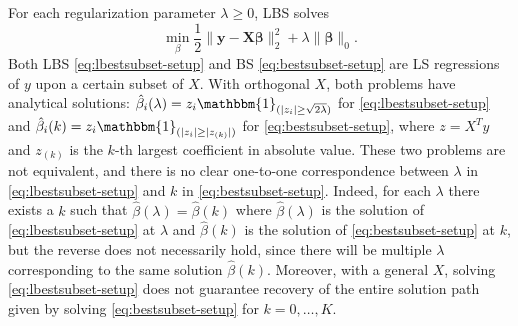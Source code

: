 For each regularization parameter $\lambda \ge 0$, LBS solves
\begin{equation}
	\min_\beta \frac{1}{2} \lVert \mathbf{y}-\mathbf{X\beta}\rVert_2^2 + \lambda\lVert \mathbf{\beta} \rVert_0.
\label{eq:lbestsubset-setup}
\end{equation} 
Both LBS \eqref{eq:lbestsubset-setup} and BS \eqref{eq:bestsubset-setup} are LS regressions of $y$ upon a certain subset of $X$. With orthogonal $X$, both problems have analytical solutions: $\hat{\beta}_i(\lambda)=z_i \mathbbm{1}_{(|z_{i}| \ge \sqrt{2\lambda})}$ for \eqref{eq:lbestsubset-setup} and $\hat{\beta}_i(k)=z_i \mathbbm{1}_{(|z_{i}| \ge |z_{(k)}|)}$ for \eqref{eq:bestsubset-setup}, where $z=X^T y$ and $z_{(k)}$ is the $k$-th largest coefficient in absolute value. These two problems are not equivalent, and there is no clear one-to-one correspondence between $\lambda$ in \eqref{eq:lbestsubset-setup} and $k$ in \eqref{eq:bestsubset-setup}. Indeed, for each $\lambda$ there exists a $k$ such that $\hat{\beta}(\lambda) = \hat{\beta}(k)$ where $\hat{\beta}(\lambda)$ is the solution of \eqref{eq:lbestsubset-setup} at $\lambda$ and $\hat{\beta}(k)$ is the solution of \eqref{eq:bestsubset-setup} at $k$, but the reverse does not necessarily hold, since there will be multiple $\lambda$ corresponding to the same solution $\hat{\beta}(k)$. Moreover, with a general $X$, solving \eqref{eq:lbestsubset-setup} does not guarantee recovery of the entire solution path given by solving \eqref{eq:bestsubset-setup} for $k=0,\dots,K$.

